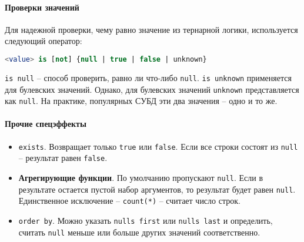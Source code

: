 \paragraph{Проверки значений}

Для надежной проверки, чему равно значение из тернарной логики, используется следующий оператор:

\begin{lstlisting}[language=SQL]
    <value> is [not] {null | true | false | unknown}
\end{lstlisting}

\texttt{is null} -- способ проверить, равно ли что-либо \texttt{null}.
\texttt{is unknown}
применяется для булевских значений. Однако, для булевских значений \texttt{unknown}
представляется как \texttt{null}. На практике, популярных СУБД эти два значения -- одно и
то же.

\paragraph{Прочие спецэффекты}

\begin{itemize}
	\item \texttt{exists}. Возвращает только \texttt{true} или \texttt{false}. Если
	      все строки состоят из \texttt{null} -- результат равен \texttt{false}.
	\item \textbf{Агрегирующие функции}. По умолчанию пропускают \texttt{null}. Если в результате
	      остается пустой набор аргументов, то результат будет равен \texttt{null}. Единственное
	      исключение -- \texttt{count(*)} -- считает число строк.
	\item \texttt{order by}. Можно указать \texttt{nulls first} или \texttt{nulls last} и
	      определить, считать \texttt{null} меньше или больше других значений соответственно.
\end{itemize}
